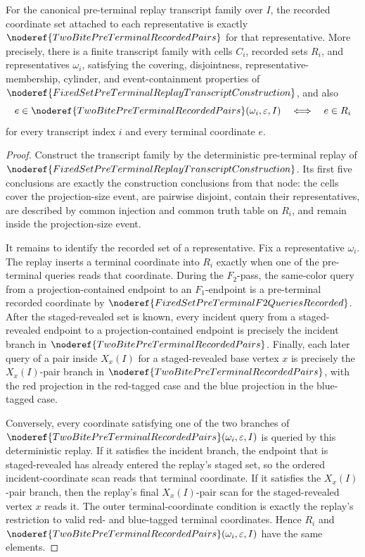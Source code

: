 \begin{helper}
For the canonical pre-terminal replay transcript family over \(I\), the
recorded coordinate set attached to each representative is exactly
\(\noderef{TwoBitePreTerminalRecordedPairs}\) for that representative.  More
precisely, there is a finite transcript family with cells \(C_i\), recorded
sets \(R_i\), and representatives \(\omega_i\), satisfying the covering,
disjointness, representative-membership, cylinder, and event-containment
properties of \(\noderef{FixedSetPreTerminalReplayTranscriptConstruction}\),
and also
\[
e\in \noderef{TwoBitePreTerminalRecordedPairs}(\omega_i,\varepsilon,I)
\quad\Longleftrightarrow\quad
e\in R_i
\]
for every transcript index \(i\) and every terminal coordinate \(e\).
\end{helper}
\begin{proof}
Construct the transcript family by the deterministic pre-terminal replay of
\(\noderef{FixedSetPreTerminalReplayTranscriptConstruction}\).  Its first
five conclusions are exactly the construction conclusions from that node:
the cells cover the projection-size event, are pairwise disjoint, contain
their representatives, are described by common injection and common truth
table on \(R_i\), and remain inside the projection-size event.

It remains to identify the recorded set of a representative.  Fix a
representative \(\omega_i\).  The replay inserts a terminal coordinate into
\(R_i\) exactly when one of the pre-terminal queries reads that coordinate.
During the \(F_2\)-pass, the same-color query from a projection-contained
endpoint to an \(F_1\)-endpoint is a pre-terminal recorded coordinate by
\(\noderef{FixedSetPreTerminalF2QueriesRecorded}\).  After the staged-revealed
set is known, every incident query from a staged-revealed endpoint to a
projection-contained endpoint is precisely the incident branch in
\(\noderef{TwoBitePreTerminalRecordedPairs}\).  Finally, each later query of
a pair inside \(X_x(I)\) for a staged-revealed base vertex \(x\) is precisely
the \(X_x(I)\)-pair branch in
\(\noderef{TwoBitePreTerminalRecordedPairs}\), with the red projection in the
red-tagged case and the blue projection in the blue-tagged case.

Conversely, every coordinate satisfying one of the two branches of
\(\noderef{TwoBitePreTerminalRecordedPairs}(\omega_i,\varepsilon,I)\) is
queried by this deterministic replay.  If it satisfies the incident branch,
the endpoint that is staged-revealed has already entered the replay's staged
set, so the ordered incident-coordinate scan reads that terminal coordinate.
If it satisfies the \(X_x(I)\)-pair branch, then the replay's final
\(X_x(I)\)-pair scan for the staged-revealed vertex \(x\) reads it.  The
outer terminal-coordinate condition is exactly the replay's restriction to
valid red- and blue-tagged terminal coordinates.  Hence \(R_i\) and
\(\noderef{TwoBitePreTerminalRecordedPairs}(\omega_i,\varepsilon,I)\) have
the same elements.
\end{proof}

